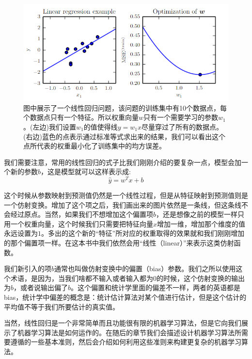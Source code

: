 \begin{figure}[htbp] %
   \centering
   \includegraphics[width=6in]{fig/chap5/5_1.PNG} 
   \caption{图中展示了一个线性回归问题，该问题的训练集中有10个数据点，每个数据点只有一个特征。所以权重向量$w$只有一个需要学习的参数$w_1$ 。(左边)我们设置$w_1$的值使得线$y=w_1x$尽量穿过了所有的数据点。(右边)蓝色的点表示通过标准等式求出来的结果，我们可以看出这个点所代表的权重最小化了训练集中的均方误差。}
   \label{fig:5_1}
\end{figure}

我们需要注意，常用的线性回归的式子比我们刚刚介绍的要复杂一点，模型会加一个新的参数$b$，这是模型就可以这样表示成:
\begin{equation}
  \hat{y}=w^{T}x+b
\end{equation}

这个时候从参数映射到预测值仍然是一个线性过程，但是从特征映射到预测值则是一个仿射变换。增加了这个项之后，我们画出来的图片依然是一条线，但这条线不会经过原点。当然，如果我们不想增加这个偏置项$b$，还是想像之前的模型一样只用一个权重向量，这个时候我们只需要把特征向量$x$增加一维，增加那个维度的值永远设置为$1$。多出的这个新的“特征”所对应的权重取得的效果就和我们刚刚增加的那个偏置项一样。在这本书中我们依然会用“线性（linear）”来表示这类仿射函数。

我们新引入的项$b$通常也叫做仿射变换中的偏置（bias）参数。我们之所以使用这个术语，是因为，当我们啥都不输入或者输入都为$0$的时候，这个仿射变换的输出为$b$，或者说输出偏了$b$。这个偏置和统计学里面的偏差不一样，两者的英语都是bias，统计学中偏差的概念是：统计估计算法对某个值进行估计，但是这个估计的平均值不等于我们所要估计的真实值。

当然，线性回归是一个非常简单而且功能很有限的机器学习算法，但是它向我们展示了机器学习算法是如何运作的。在随后的章节我们会描述设计机器学习算法所需要遵循的一些基本准则，然后会介绍如何利用这些准则来构建更复杂的机器学习算法。

